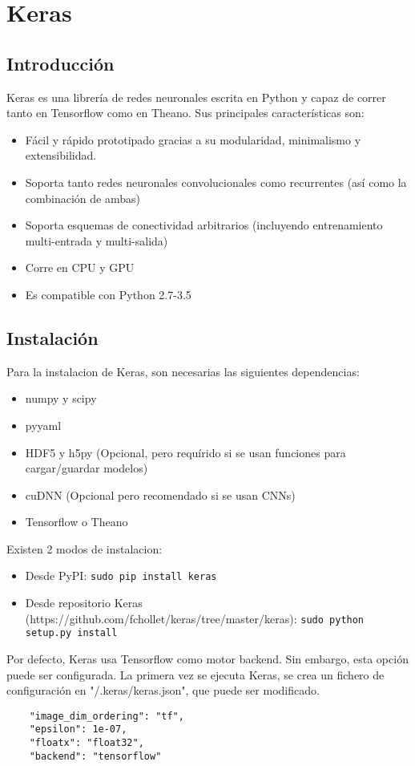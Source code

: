 \chapter{Keras}
\section{Introducción}
Keras es una librería de redes neuronales escrita en Python y capaz de correr tanto en Tensorflow como en Theano. Sus principales características son:
\begin{itemize}[noitemsep]
\item Fácil y rápido prototipado gracias a su modularidad, minimalismo y extensibilidad.
\item Soporta tanto redes neuronales convolucionales como recurrentes (así como la combinación de ambas)
\item Soporta esquemas de conectividad arbitrarios (incluyendo entrenamiento multi-entrada y multi-salida)
\item Corre en CPU y GPU
\item Es compatible con Python 2.7-3.5
 \end{itemize}

 \section{Instalación}
 Para la instalacion de Keras, son necesarias las siguientes dependencias:
 \begin{itemize}[noitemsep]
\item numpy y scipy
\item pyyaml
\item HDF5 y h5py (Opcional, pero requírido si se usan funciones para cargar/guardar modelos)
\item cuDNN (Opcional pero recomendado si se usan CNNs)
\item Tensorflow o Theano
 \end{itemize}
Existen 2 modos de instalacion:
 \begin{itemize}[noitemsep]
 \item Desde PyPI: \lstinline{sudo pip install keras}
 \item Desde repositorio Keras (https://github.com/fchollet/keras/tree/master/keras): \lstinline{sudo python setup.py install}
 \end{itemize}
 Por defecto, Keras usa Tensorflow como motor backend. Sin embargo, esta opción puede ser configurada. La primera vez se ejecuta Keras, se crea un fichero de configuración en "/.keras/keras.json", que puede ser modificado.
\begin{lstlisting}
    "image_dim_ordering": "tf",
    "epsilon": 1e-07,
    "floatx": "float32",
    "backend": "tensorflow"
\end{lstlisting}


